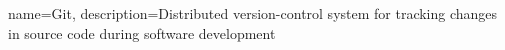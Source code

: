 
{
	name=Git,
	description={Distributed version-control system for tracking changes in source code
	during software development}
}